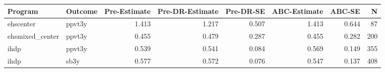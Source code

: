 \begin{table}[ht]
\centering
\begin{tabular}{llrrrrrr}
  \hline
Program & Outcome & Pre-Estimate & Pre-DR-Estimate & Pre-DR-SE & ABC-Estimate & ABC-SE & N \\ 
  \hline
ehscenter & ppvt3y & 1.413 & 1.217 & 0.507 & 1.413 & 0.644 & 87 \\ 
  ehsmixed\_center & ppvt3y & 0.455 & 0.479 & 0.287 & 0.455 & 0.282 & 200 \\ 
  ihdp & ppvt3y & 0.539 & 0.541 & 0.084 & 0.569 & 0.149 & 355 \\ 
  ihdp & sb3y & 0.577 & 0.572 & 0.076 & 0.547 & 0.137 & 408 \\ 
   \hline
\end{tabular}
\end{table}
